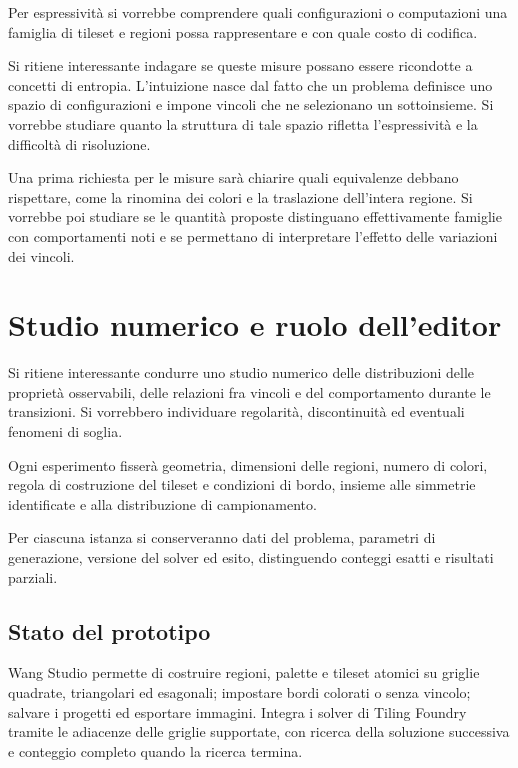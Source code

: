 \documentclass[11pt,a4paper]{article}
\begin{document}
Per espressività si vorrebbe comprendere quali configurazioni o computazioni una famiglia di tileset e regioni possa rappresentare e con quale costo di codifica.

Si ritiene interessante indagare se queste misure possano essere ricondotte a concetti di entropia. L'intuizione nasce dal fatto che un problema definisce uno spazio di configurazioni e impone vincoli che ne selezionano un sottoinsieme. Si vorrebbe studiare quanto la struttura di tale spazio rifletta l'espressività e la difficoltà di risoluzione.

Una prima richiesta per le misure sarà chiarire quali equivalenze debbano rispettare, come la rinomina dei colori e la traslazione dell'intera regione. Si vorrebbe poi studiare se le quantità proposte distinguano effettivamente famiglie con comportamenti noti e se permettano di interpretare l'effetto delle variazioni dei vincoli.

\section{Studio numerico e ruolo dell'editor}

Si ritiene interessante condurre uno studio numerico delle distribuzioni delle proprietà osservabili, delle relazioni fra vincoli e del comportamento durante le transizioni. Si vorrebbero individuare regolarità, discontinuità ed eventuali fenomeni di soglia.

Ogni esperimento fisserà geometria, dimensioni delle regioni, numero di colori, regola di costruzione del tileset e condizioni di bordo, insieme alle simmetrie identificate e alla distribuzione di campionamento.

Per ciascuna istanza si conserveranno dati del problema, parametri di generazione, versione del solver ed esito, distinguendo conteggi esatti e risultati parziali.

\subsection{Stato del prototipo}

Wang Studio permette di costruire regioni, palette e tileset atomici su griglie quadrate, triangolari ed esagonali; impostare bordi colorati o senza vincolo; salvare i progetti ed esportare immagini. Integra i solver di Tiling Foundry tramite le adiacenze delle griglie supportate, con ricerca della soluzione successiva e conteggio completo quando la ricerca termina.
\end{document}
